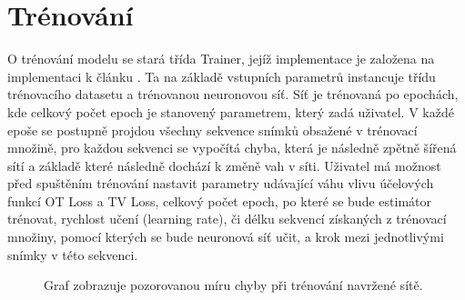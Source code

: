 \section{Trénování}
O trénování modelu se stará třída Trainer, jejíž implementace je založena na implementaci k článku \cite{DM_Count}.
Ta na základě vstupních parametrů instancuje třídu trénovacího datasetu a trénovanou neuronovou síť.
Síť je trénovaná po epochách, kde celkový počet epoch je stanovený parametrem, který zadá uživatel.
V každé epoše se postupně projdou všechny sekvence snímků obsažené v trénovací množině, pro každou sekvenci se vypočítá chyba, která je následně zpětně šířená sítí a základě které následně dochází k změně vah v síti.
Uživatel má možnost před spuštěním trénování nastavit parametry udávající váhu vlivu účelových funkcí OT Loss a TV Loss, celkový počet epoch, po které se bude estimátor trénovat, rychlost učení (learning rate), či délku sekvencí získaných z trénovací množiny, pomocí kterých se bude neuronová síť učit, a krok mezi jednotlivými snímky v této sekvenci.

\begin{figure}[h!]
	\centering
	
	\caption{Graf zobrazuje pozorovanou míru chyby při trénování navržené sítě.}
	\label{fig:loss_change}
\end{figure}

\endinput
